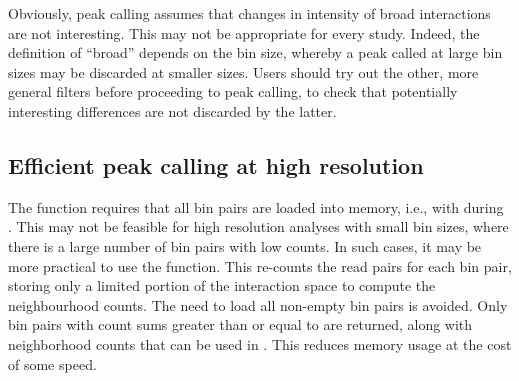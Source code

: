 \documentclass{report}\usepackage[]{graphicx}\usepackage[usenames,dvipsnames]{color}
\newcommand{\hlnum}[1]{\textcolor[rgb]{0.816,0.125,0.439}{#1}}%
\newcommand{\hlstr}[1]{\textcolor[rgb]{0.251,0.627,0.251}{#1}}%
\newcommand{\hlcom}[1]{\textcolor[rgb]{0.502,0.502,0.502}{\textit{#1}}}%
\newcommand{\hlopt}[1]{\textcolor[rgb]{0,0,0}{#1}}%
\newcommand{\hlstd}[1]{\textcolor[rgb]{0.251,0.251,0.251}{#1}}%
\newcommand{\hlkwb}[1]{\textcolor[rgb]{0,0,0}{#1}}%
\newcommand{\hlkwc}[1]{\textcolor[rgb]{0.251,0.251,0.251}{#1}}%
\newcommand{\hlkwd}[1]{\textcolor[rgb]{0.878,0.439,0.125}{#1}}%
\newenvironment{knitrout}{}{} %
\begin{document}
\begin{knitrout}
\color{fgcolor}
\end{knitrout}

Obviously, peak calling assumes that changes in intensity of broad interactions are not interesting.
This may not be appropriate for every study.
Indeed, the definition of ``broad'' depends on the bin size, whereby a peak called at large bin sizes may be discarded at smaller sizes.
Users should try out the other, more general filters before proceeding to peak calling, to check that potentially interesting differences are not discarded by the latter.

\subsection{Efficient peak calling at high resolution}
The  function requires that all bin pairs are loaded into memory, i.e., with  during .
This may not be feasible for high resolution analyses with small bin sizes, where there is a large number of bin pairs with low counts.
In such cases, it may be more practical to use the  function.
This re-counts the read pairs for each bin pair, storing only a limited portion of the interaction space to compute the neighbourhood counts.
The need to load all non-empty bin pairs is avoided.
Only bin pairs with count sums greater than or equal to  are returned, along with neighborhood counts that can be used in . 
This reduces memory usage at the cost of some speed.
\end{document}
